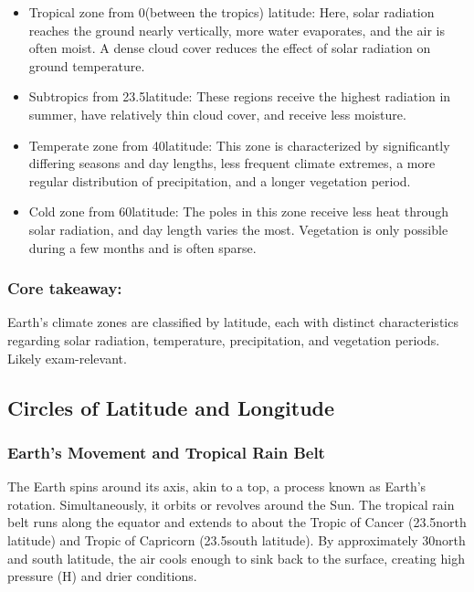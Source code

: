 \begin{itemize} 
    \item Tropical zone from 0\textdegree (between the tropics) latitude: Here, solar radiation reaches the ground nearly vertically, more water evaporates, and the air is often moist. A dense cloud cover reduces the effect of solar radiation on ground temperature. 
    \item Subtropics from 23.5\textdegree latitude: These regions receive the highest radiation in summer, have relatively thin cloud cover, and receive less moisture. 
    \item Temperate zone from 40\textdegree latitude: This zone is characterized by significantly differing seasons and day lengths, less frequent climate extremes, a more regular distribution of precipitation, and a longer vegetation period. 
    \item Cold zone from 60\textdegree latitude: The poles in this zone receive less heat through solar radiation, and day length varies the most. Vegetation is only possible during a few months and is often sparse. 
\end{itemize}

\subsubsection*{Core takeaway:} 
Earth's climate zones are classified by latitude, each with distinct characteristics regarding solar radiation, temperature, precipitation, and vegetation periods. Likely exam-relevant.


\subsection{Circles of Latitude and Longitude} 
\subsubsection*{Earth's Movement and Tropical Rain Belt} 
The Earth spins around its axis, akin to a top, a process known as Earth's rotation. Simultaneously, it orbits or revolves around the Sun. The tropical rain belt runs along the equator and extends to about the Tropic of Cancer (23.5\textdegree north latitude) and Tropic of Capricorn (23.5\textdegree south latitude). By approximately 30\textdegree north and south latitude, the air cools enough to sink back to the surface, creating high pressure (H) and drier conditions.
